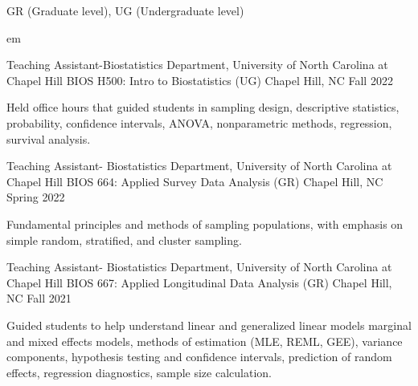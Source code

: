 

\begin{cventries}

  \cventry
    {GR (Graduate level), UG (Undergraduate level)} %
    {} %
    {} %
    {} %
    {}

     em
    
  \cventry
    {Teaching Assistant-Biostatistics Department, University of North Carolina at Chapel Hill} %
    {BIOS H500: Intro to Biostatistics (UG)} %
    {Chapel Hill, NC} %
    {Fall 2022} %
    {\begin{cvitems} %
    \item Held office hours that guided students in sampling design, descriptive statistics, probability, confidence intervals, ANOVA, \newline nonparametric methods, regression, survival analysis.
    \end{cvitems}}

  \cventry
    {Teaching Assistant- Biostatistics Department, University of North Carolina at Chapel Hill} %
    {BIOS 664: Applied Survey Data Analysis (GR)} %
    {Chapel Hill, NC} %
    {Spring 2022} %
    {\begin{cvitems} %
    \item Fundamental principles and methods of sampling populations, with emphasis on simple random, stratified, and cluster sampling.
    \end{cvitems}}

  \cventry
    {Teaching Assistant- Biostatistics Department, University of North Carolina at Chapel Hill} %
    {BIOS 667: Applied Longitudinal Data Analysis (GR)} %
    {Chapel Hill, NC} %
    {Fall 2021} %
    {\begin{cvitems} %
    \item Guided students to help understand linear and generalized linear models marginal and mixed effects models, \newline methods of estimation (MLE, REML, GEE), variance components, hypothesis testing  and confidence intervals, prediction of \newline random effects, regression diagnostics, sample size calculation.
    \end{cvitems}
    }
    

\end{cventries}
